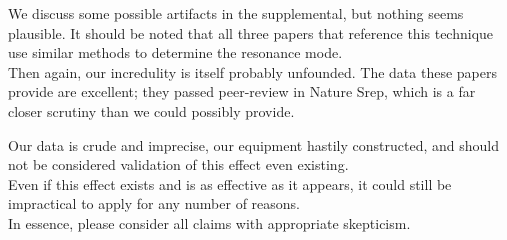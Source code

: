 \documentclass[paper.tex]{subfiles}
\begin{document}
\begin{autem}
We discuss some possible artifacts in the supplemental, but nothing seems plausible. It should be noted that all three papers that reference this technique use similar methods to determine the resonance mode.\\

Then again, our incredulity is itself probably unfounded. The data these papers provide are excellent; they passed peer-review in Nature Srep, which is a far closer scrutiny than we could possibly provide.

Our data is crude and imprecise, our equipment hastily constructed, and should not be considered validation of this effect even existing. \\

Even if this effect exists and is as effective as it appears, it could still be impractical to apply for any number of reasons.\\


In essence, please consider all claims with appropriate skepticism.

\end{autem}
\end{document}
